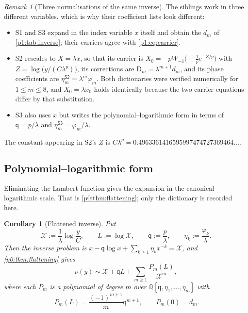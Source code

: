 \documentclass[11pt,a4paper,oneside]{book}
\theoremstyle{plain}
\newtheorem{corollary}[theorem]{Corollary}
\theoremstyle{definition}
\theoremstyle{remark}
\newtheorem{remark}[theorem]{Remark}
\newcommand{\Rat}{\mathbb{Q}}
\newcommand{\e}{\mathrm{e}}
\newcommand{\Coef}[1]{[#1]\,}
\newcommand{\Wlam}{W}
\begin{document}
\begin{remark}[Three normalisations of the same inverse]
\label{p1:rem:normalisations}
The siblings work in three different variables, which is why their coefficient lists look
different:
\begin{itemize}
\item \textsf{S1} and \textsf{S3} expand in the index variable $x$ itself and
      obtain the $d_m$ of \cref{p1:tab:inverse}; their carriers agree with
      \cref{p1:eq:carrier}.
\item \textsf{S2} rescales to $X=\lambda x$, so that its carrier is
      $X_0=-p\Wlam_{-1}\bigl(-\tfrac1p\e^{-Z/p}\bigr)$ with
      $Z=\log\bigl(y/(C\lambda^{p})\bigr)$, its corrections are
      $\mathrm D_m=\lambda^{m+1}d_m$, and its phase coefficients are
      $\eta_m^{\textsf{S2}}=\lambda^{m}\varphi_m$.  Both dictionaries were
      verified numerically for $1\le m\le8$, and $X_0=\lambda x_0$ holds
      identically because the two carrier equations differ by that
      substitution.
\item \textsf{S3} also uses $x$ but writes the polynomial--logarithmic form
      in terms of $\mathsf q=p/\lambda$ and
      $\eta_m^{\textsf{S3}}=\varphi_m/\lambda$.
\end{itemize}
The constant appearing in \textsf{S2}'s $Z$ is
$C\lambda^{p}=0.4963361416595997474727369464\ldots$.
\end{remark}

\subsection{Polynomial--logarithmic form}

Eliminating the Lambert function gives the expansion in the canonical logarithmic scale.  That
is \cref{p0:thm:flattening}; only the dictionary is recorded here.

\begin{corollary}[Flattened inverse]
\label{p1:cor:flattening}
Put
\begin{equation}
 \mathcal X:=\frac1\lambda\log\frac yC,\qquad
 L:=\log\mathcal X,\qquad
 \mathsf q:=\frac p\lambda,\qquad
 \eta_k:=\frac{\varphi_k}{\lambda} .
 \label{p1:eq:flatten-dict}
\end{equation}
Then the inverse problem is $x-\mathsf q\log x+\sum_{k\ge1}\eta_kx^{-k} =\mathcal X$, and
\cref{p0:thm:flattening} gives
\begin{equation}
 \boxed{\;
 \nu(y)\sim\mathcal X+\mathsf qL
 +\sum_{m\ge1}\frac{P_m(L)}{\mathcal X^{m}},\;}
 \label{p1:eq:flattened}
\end{equation}
where each $P_m$ is a polynomial of degree $m$ over $\Rat[\mathsf q,\eta_1,\ldots,\eta_m]$
with
\begin{equation}
 \Coef{L^{m}}P_m(L)=\frac{(-1)^{m+1}}{m}\mathsf q^{m+1},
 \qquad P_m(0)=d_m .
 \label{p1:eq:P-shape}
\end{equation}
\end{corollary}
\end{document}
